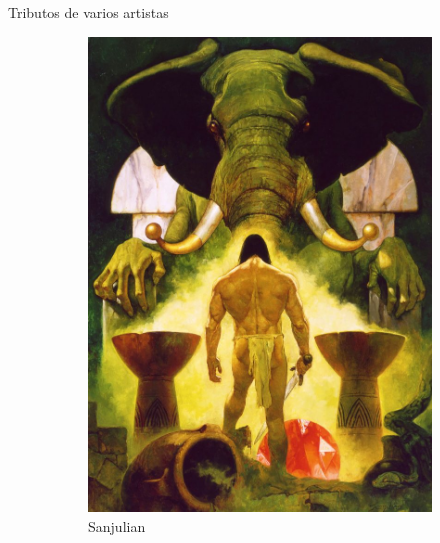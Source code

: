\begin{frame}{Tributos de varios artistas}
\begin{figure}[htp]
\begin{subfigure}[b]{0.22\textwidth}
			\includegraphics[width=\textwidth]{img/tributos/elephant03}
			\caption{Sanjulian}
		\end{subfigure}
		~
		\begin{subfigure}[b]{0.22\textwidth}

\end{subfigure}
\end{figure}
\end{frame}
